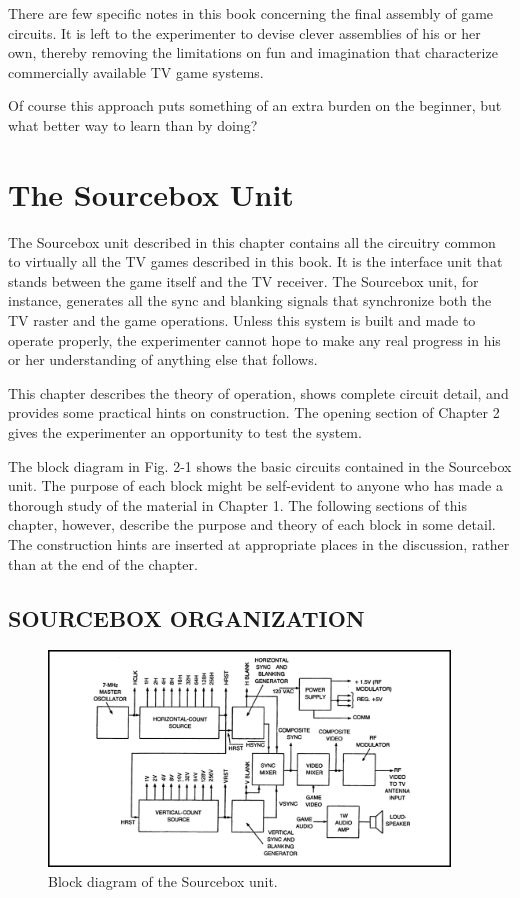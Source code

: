 \documentclass[11pt]{book}              %
\begin{document}
There are few specific notes in this book concerning the final assembly of game circuits. It is left to the experimenter to devise clever assemblies of his or her own, thereby removing the limitations on fun and imagination that characterize commercially available TV game systems.

Of course this approach puts something of an extra burden on the beginner, but what better way to learn than by doing?


\chapter{The Sourcebox Unit}
 
The Sourcebox unit described in this chapter contains all the circuitry common to virtually all the TV games described in this book. It is the interface unit that stands between the game itself and the TV receiver. The Sourcebox unit, for instance, generates all the sync and blanking signals that synchronize both the TV raster and the game operations. Unless this system is built and made to operate properly, the experimenter cannot hope to make any real progress in his or her understanding of anything else that follows.

This chapter describes the theory of operation, shows complete circuit detail, and provides some practical hints on construction. The opening section of Chapter 2 gives the experimenter an opportunity to test the system.

The block diagram in Fig. 2-1 shows the basic circuits contained in the Sourcebox unit. The purpose of each block might be self-evident to anyone who has made a thorough study of the material in Chapter 1. The following sections of this chapter, however, describe the purpose and theory of each block in some detail. The construction hints are inserted at appropriate places in the discussion, rather than at the end of the chapter.

\section{SOURCEBOX ORGANIZATION}

\begin{figure}
  \centering
  \includegraphics[width=0.95\textwidth]{images/fig2-1}
  \caption{Block diagram of the Sourcebox unit.
}
\end{figure}
\end{document}
